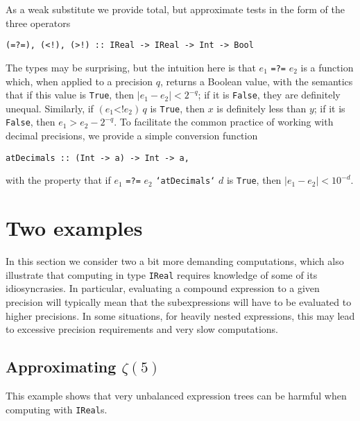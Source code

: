 \documentclass[9pt, a4, twocolumn]{article}
\begin{document}
As a weak substitute we provide
total, but approximate 
tests in the form of the three operators
\begin{verbatim}
(=?=), (<!), (>!) :: IReal -> IReal -> Int -> Bool
\end{verbatim}
The types may be surprising, but the intuition here is that $e_1$ \texttt{=?=}
$e_2$ is a function which, when applied to a precision $q$, returns
a Boolean value, with the semantics that if this value is
\texttt{True}, then $|e_1 - e_2| < 2^{-q}$; if it is \texttt{False},
they are definitely unequal. Similarly, if $(e_1
\texttt{<!} e_2) \, q$ is \texttt{True}, then $x$ is definitely less
than $y$; if it is \texttt{False}, then  $e_1 > e_2 - 2^{-q}$.
To facilitate the common practice of working with decimal precisions, 
we provide a simple conversion function
\begin{verbatim}
atDecimals :: (Int -> a) -> Int -> a,
\end{verbatim}
with the property that if  $e_1$ \texttt{=?=} $e_2$
\texttt{`atDecimals`} $d$ is \texttt{True}, then $|e_1 - e_2| < 10^{-d}$.

\section{Two examples}

In this section we consider two a bit more demanding computations, which also
illustrate that computing in type \texttt{IReal} requires knowledge
of some of its idiosyncrasies. In particular, evaluating a compound
expression to a given precision will typically mean that the
subexpressions will have to be evaluated to higher precisions. In some
situations, for heavily nested expressions, this may lead to excessive
precision requirements and very slow computations. 


\subsection{Approximating $\zeta(5)$}

This example shows that very unbalanced expression trees can be
harmful when computing with \texttt{IReal}s.
\end{document}

